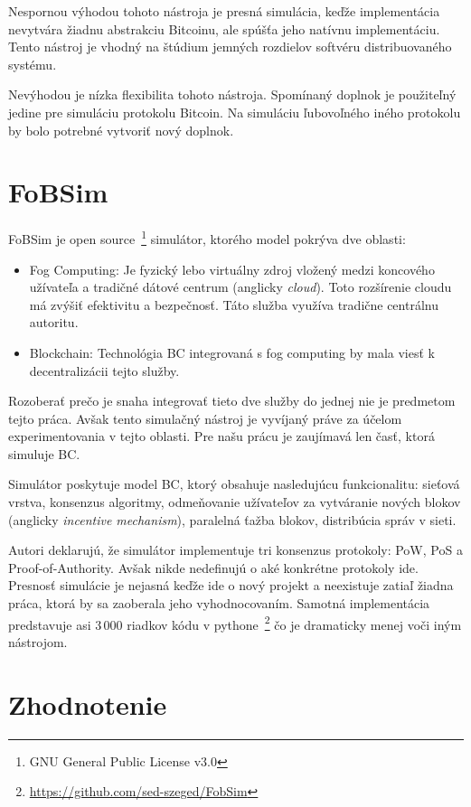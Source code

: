 Nespornou výhodou tohoto nástroja je presná simulácia, keďže implementácia nevytvára žiadnu abstrakciu Bitcoinu, ale spúšťa jeho natívnu implementáciu. Tento nástroj je vhodný na štúdium jemných rozdielov softvéru distribuovaného systému.

Nevýhodou je nízka flexibilita tohoto nástroja. Spomínaný doplnok je použiteľný jedine pre simuláciu protokolu Bitcoin. Na simuláciu ľubovoľného iného protokolu by bolo potrebné vytvoriť nový doplnok.~\cite{shadowBitcoin}

\section{FoBSim}

FoBSim je open source~\footnote{GNU General Public License v3.0} simulátor, ktorého model pokrýva dve oblasti:
\begin{itemize}
	\item Fog Computing: Je fyzický lebo virtuálny zdroj vložený medzi koncového užívateľa a tradičné dátové centrum (anglicky \textit{cloud}). Toto rozšírenie cloudu má zvýšiť efektivitu a bezpečnosť. Táto služba využíva tradične centrálnu autoritu.
	\item Blockchain: Technológia BC integrovaná s fog computing by mala viesť k decentralizácii tejto služby.
\end{itemize}
Rozoberať prečo je snaha integrovať tieto dve služby do jednej nie je predmetom tejto práca. Avšak tento simulačný nástroj je vyvíjaný práve za účelom experimentovania v tejto oblasti. Pre našu prácu je zaujímavá len časť, ktorá simuluje BC.

Simulátor poskytuje model BC, ktorý obsahuje nasledujúcu funkcionalitu: sieťová vrstva, konsenzus algoritmy, odmeňovanie užívateľov za vytváranie nových blokov (anglicky \textit{incentive mechanism}), paralelná ťažba blokov, distribúcia správ v sieti.~\cite{fobsimWp}

Autori deklarujú, že simulátor implementuje tri konsenzus protokoly: PoW, PoS a Proof-of-Authority. Avšak nikde nedefinujú o aké konkrétne protokoly ide. Presnosť simulácie je nejasná keďže ide o nový projekt a neexistuje zatiaľ žiadna práca, ktorá by sa zaoberala jeho vyhodnocovaním. Samotná implementácia predstavuje asi 3\,000 riadkov kódu v pythone~\footnote{\url{https://github.com/sed-szeged/FobSim}} čo je dramaticky menej voči iným nástrojom. 

\section{Zhodnotenie}

